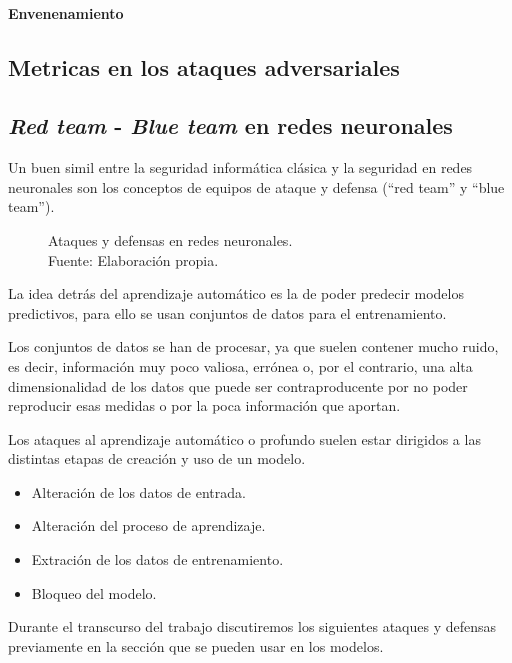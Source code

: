 \paragraph{Envenenamiento}

\subsection{Metricas en los ataques adversariales}

\subsection{\textit{Red team} - \textit{Blue team} en redes neuronales}

Un buen simil entre la seguridad informática clásica y la seguridad en redes neuronales son los conceptos de equipos de ataque y defensa (``red team'' y ``blue team'').

\begin{figure}[H]
  \centering
  \centerline{}
  \caption{Ataques y defensas en redes neuronales.\\Fuente: Elaboración propia.}
  \label{fig:art-for-red-and-blue-teams}
\end{figure}

La idea detrás del aprendizaje automático es la de poder predecir modelos predictivos, para ello se usan conjuntos de datos para el entrenamiento.

Los conjuntos de datos se han de procesar, ya que suelen contener mucho ruido, es decir, información muy poco valiosa, errónea o, por el contrario, una alta dimensionalidad de los datos que puede ser contraproducente por no poder reproducir esas medidas o por la poca información que aportan.

Los ataques al aprendizaje automático o profundo suelen estar dirigidos a las distintas etapas de creación y uso de un modelo.

\begin{itemize}
  \item Alteración de los datos de entrada.
  \item Alteración del proceso de aprendizaje.
  \item Extración de los datos de entrenamiento.
  \item Bloqueo del modelo.
\end{itemize}

Durante el transcurso del trabajo discutiremos los siguientes ataques y defensas previamente en la sección  que se pueden usar en los modelos.

